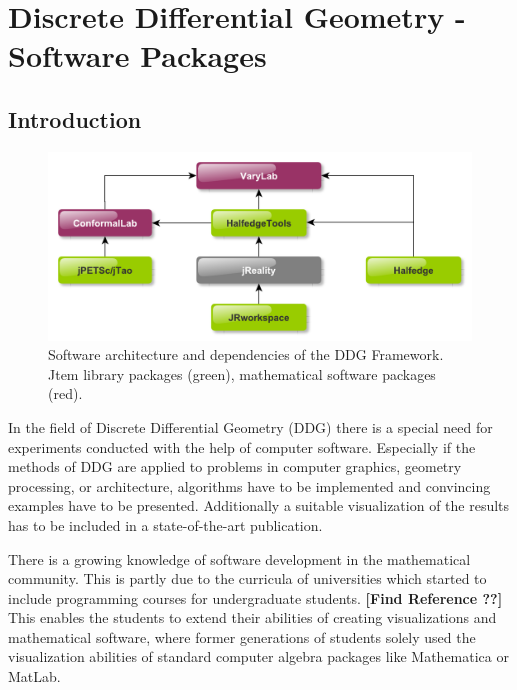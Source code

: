 \chapter{Discrete Differential Geometry - Software Packages}

\section{Introduction}

\begin{figure}[h]
	\centering
	\includegraphics[width=\linewidth]{figures/software_architecture}
	\caption[Software package dependencies]{
		Software architecture and dependencies of the DDG Framework. 
		{\sc Jtem} library packages (green), mathematical software packages (red).
	}
	\label{fig:software_architecture}
\end{figure}

In the field of Discrete Differential Geometry (DDG) there is a special need for experiments
conducted with the help of computer software. Especially if the methods of DDG are applied
to problems in computer graphics, geometry processing, or architecture, algorithms have 
to be implemented and convincing examples have to be presented. Additionally a suitable 
visualization of the results has to be included in a state-of-the-art publication.

There is a growing knowledge of software development in the mathematical community. This 
is partly due to the curricula of universities which started to include programming courses for 
undergraduate students. {\bf [Find Reference ??]}
This enables the students to extend their abilities of creating visualizations and mathematical software, where former generations of students solely 
used the visualization abilities of standard computer algebra packages like Mathematica or MatLab.

